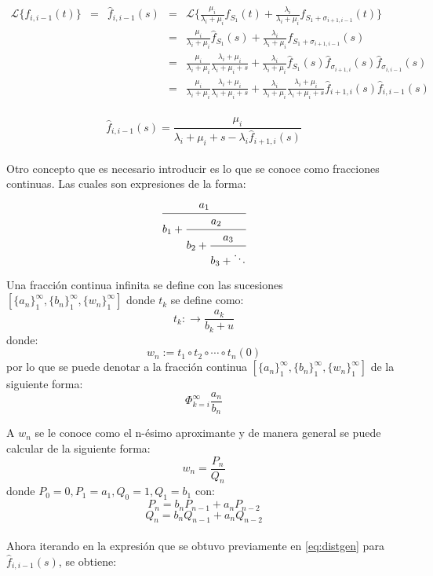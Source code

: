 \documentclass[11pt]{article}
\numberwithin{equation}{section} %
\begin{document}
\[
\begin{array}{rcrcl}
\mathcal{L} \{ f_{i,i-1}(t) \} & = & \hat{f}_{i,i-1}(s) & = & \mathcal{L} \{ \frac{\mu_{i}}{\lambda_{i}+\mu_{i}} f_{S_{1}}(t) + \frac{\lambda_{i}}{\lambda_{i}+\mu_{i}} f_{ S_{1} + \sigma_{i+1,i-1}}(t) \}\\
 & & & = & \frac{\mu_{i}}{\lambda_{i}+\mu_{i}} \hat{f}_{S_{1}}(s) + \frac{\lambda_{i}}{\lambda_{i}+\mu_{i}} f_{ S_{1} + \sigma_{i+1,i-1}}(s) \\
 & & & = & \frac{\mu_{i}}{\lambda_{i}+\mu_{i}} \frac{\lambda_{i}+\mu_{i}}{\lambda_{i}+\mu_{i}+s} + \frac{\lambda_{i}}{\lambda_{i}+\mu_{i}} \hat{f}_{S_{1}}(s) \hat{f}_{\sigma_{i+1,i}}(s) \hat{f}_{\sigma_{i,i-1}}(s) \\
 & & & = & \frac{\mu_{i}}{\lambda_{i}+\mu_{i}} \frac{\lambda_{i}+\mu_{i}}{\lambda_{i}+\mu_{i}+s} + \frac{\lambda_{i}}{\lambda_{i}+\mu_{i}} \frac{\lambda_{i}+\mu_{i}}{\lambda_{i}+\mu_{i}+s} \hat{f}_{i+1,i}(s) \hat{f}_{i,i-1}(s) \\
\end{array}
\]
 
\begin{equation} \label{eq:distgen}
\hat{f}_{i,i-1}(s) = \frac{\mu_{i}}{\lambda_{i}+\mu_{i}+s-\lambda_{i}\hat{f}_{i+1,i}(s)}
\end{equation}\\

Otro concepto que es necesario introducir es lo que se conoce como fracciones continuas. Las cuales son expresiones de la forma:
\[
\cfrac{a_1}{b_1 + 
\cfrac{a_2}{b_2 + 
\cfrac{a_3}{b_3+ \ddots}}}
\]

Una fracción continua infinita se define con las sucesiones $\left[\{a_n\}_1^{\infty},\{b_n\}_1^{\infty},\{w_n\}_1^{\infty}\right]$ donde $t_k$ se define como:
\[
t_k:\rightarrow \frac{a_k}{b_k+u}
\]
donde:
\[
w_n:=t_1\circ t_2 \circ \cdots \circ t_n(0)
\]
por lo que se puede denotar a la fracción continua $\left[\{a_n\}_1^{\infty},\{b_n\}_1^{\infty},\{w_n\}_1^{\infty}\right]$ de la siguiente forma:
\[
\Phi_{k=i}^{\infty}\frac{a_n}{b_n}
\]

A $w_n$ se le conoce como el n-ésimo aproximante y de manera general se puede calcular de la siguiente forma:
\[
w_n=\frac{P_n}{Q_n}
\]
donde $P_0=0, P_1=a_1,Q_0=1,Q_1=b_1$ con:
\[
P_n=b_n P_{n-1}+a_n P_{n-2}
\]
\[
Q_n=b_n Q_{n-1}+a_n Q_{n-2}
\]\\

Ahora iterando en la expresión que se obtuvo previamente en \ref{eq:distgen} para $\hat{f}_{i,i-1}(s)$, se obtiene:
\end{document}
